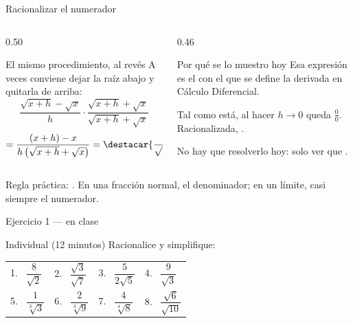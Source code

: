 \documentclass[aspectratio=169,10pt]{beamer}
\begin{document}
\begin{frame}{Racionalizar el numerador}
  \scriptsize
  \begin{columns}[T,onlytextwidth]
    \begin{column}{0.50\textwidth}
      \begin{block}{El mismo procedimiento, al revés}
        \tiny
        A veces conviene dejar la raíz abajo y quitarla de arriba:
        \[ \frac{\sqrt{x+h}-\sqrt{x}}{h}
           \cdot\frac{\sqrt{x+h}+\sqrt{x}}{\sqrt{x+h}+\sqrt{x}} \]
        \[ = \frac{(x+h)-x}{h\left(\sqrt{x+h}+\sqrt{x}\right)}
           = \destacar{\frac{1}{\sqrt{x+h}+\sqrt{x}}} \]
      \end{block}
    \end{column}
    \begin{column}{0.46\textwidth}
      \begin{alertblock}{Por qué se lo muestro hoy}
        \tiny
        Esa expresión es el  con el que se
        define la derivada en Cálculo Diferencial.

        \vspace{0.08cm}
        Tal como está, al hacer $h \to 0$ queda $\tfrac{0}{0}$. Racionalizada,
        .

        \vspace{0.08cm}
        No hay que resolverlo hoy: solo ver que .
      \end{alertblock}
    \end{column}
  \end{columns}

  \vspace{0.08cm}
  {\tiny\color{uniGris} Regla práctica: .
  En una fracción normal, el denominador; en un límite, casi siempre el
  numerador.}
\end{frame}

\begin{frame}{Ejercicio 1 — en clase}
  \begin{alertblock}{Individual (12 minutos)}
    \scriptsize
    Racionalice y simplifique:

    \vspace{0.3cm}
    \centering
    \begin{tabular}{@{}llll@{}}
      1. \ $\dfrac{8}{\sqrt{2}}$ &
      2. \ $\dfrac{\sqrt{3}}{\sqrt{7}}$ &
      3. \ $\dfrac{5}{2\sqrt{5}}$ &
      4. \ $\dfrac{9}{\sqrt{3}}$ \\[1.3em]
      5. \ $\dfrac{1}{\sqrt[3]{3}}$ &
      6. \ $\dfrac{2}{\sqrt[3]{9}}$ &
      7. \ $\dfrac{4}{\sqrt[4]{8}}$ &
      8. \ $\dfrac{\sqrt{6}}{\sqrt{10}}$ \\
    \end{tabular}
  \end{alertblock}
\end{frame}
\end{document}
